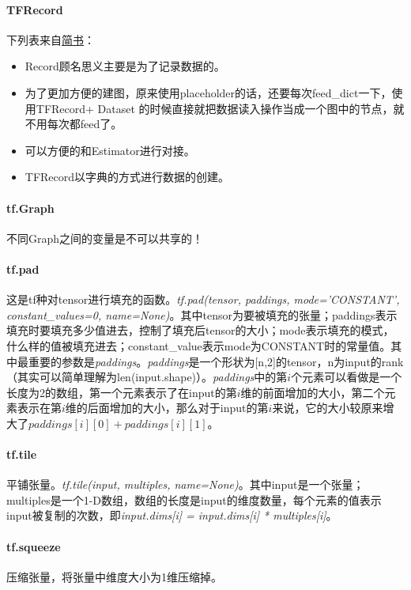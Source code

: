 \paragraph{TFRecord}
下列表来自\href{https://www.jianshu.com/p/72596a8488c3}{简书}：
\begin{itemize}
	\item Record顾名思义主要是为了记录数据的。
	\item 为了更加方便的建图，原来使用placeholder的话，还要每次feed\_dict一下，使用TFRecord+ Dataset 的时候直接就把数据读入操作当成一个图中的节点，就不用每次都feed了。
	\item 可以方便的和Estimator进行对接。
	\item TFRecord以字典的方式进行数据的创建。
\end{itemize}

\paragraph{tf.Graph}
不同Graph之间的变量是不可以共享的！


\paragraph{tf.pad}
这是tf种对tensor进行填充的函数。\textit{tf.pad(tensor, paddings, mode='CONSTANT', constant\_values=0, name=None)}。其中tensor为要被填充的张量；paddings表示填充时要填充多少值进去，控制了填充后tensor的大小；mode表示填充的模式，什么样的值被填充进去；constant\_value表示mode为CONSTANT时的常量值。其中最重要的参数是\textit{paddings}。\textit{paddings}是一个形状为[n,2]的tensor，n为input的rank（其实可以简单理解为len(input.shape)）。\textit{paddings}中的第$i$个元素可以看做是一个长度为2的数组，第一个元素表示了在input的第$i$维的前面增加的大小，第二个元素表示在第$i$维的后面增加的大小，那么对于input的第$i$来说，它的大小较原来增大了$paddings[i][0]+paddings[i][1]$。

\paragraph{tf.tile}平铺张量。\textit{tf.tile(input, multiples, name=None)}。其中input是一个张量；multiples是一个1-D数组，数组的长度是input的维度数量，每个元素的值表示input被复制的次数，即\textit{input.dims[i] = input.dims[i] * multiples[i]}。

\paragraph{tf.squeeze}压缩张量，将张量中维度大小为1维压缩掉。

